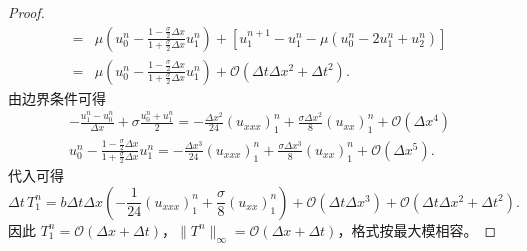 \begin{proof}
\begin{align*}
        ={}                    & \mu\left( u_{0}^n -  \frac{1-\frac{\sigma}2 \Delta x}{1 + \frac{\sigma}2 \Delta x} u_1^n \right)
        + \left[
        u_1^{n+1} - u_1^n - \mu(u_{0}^n - 2 u_1^n + u_2^n)
        \right]                                                                                                                            \\
        ={}                    & \mu\left( u_{0}^n -  \frac{1-\frac{\sigma}2 \Delta x}{1 + \frac{\sigma}2 \Delta x} u_1^n \right)
        + \mathcal{O}( \Delta t \Delta x^2 + \Delta t^2).
    \end{align*}
    由边界条件可得
    \begin{gather*}
        - \frac{u_1^n - u_{0}^n}{\Delta x} + \sigma \frac{u_0^n + u_1^n}2 = -\frac{\Delta x^2}{24} (u_{xxx})_1^n + \frac{\sigma \Delta x^2}8 (u_{xx})_1^n + \mathcal{O}(\Delta x^4) \\
        u_{0}^n -  \frac{1-\frac{\sigma}2 \Delta x}{1 + \frac{\sigma}2 \Delta x} u_1^n = -\frac{\Delta x^3}{24} (u_{xxx})_1^n + \frac{\sigma \Delta x^3}8 (u_{xx})_1^n + \mathcal{O}(\Delta x^5).
    \end{gather*}
    代入可得
    \[
        \Delta t\, T_1^{n} ={} b \Delta t \Delta x \left( -\frac1{24} (u_{xxx})_1^n + \frac{\sigma}8 (u_{xx})_1^n \right)
        + \mathcal{O}(\Delta t\Delta x^3) + \mathcal{O}( \Delta t \Delta x^2 + \Delta t^2).
    \]
    因此 $T_1^n = \mathcal{O}(\Delta x + \Delta t)$，$\|T^n\|_{\infty} = \mathcal{O}(\Delta x + \Delta t)$，格式按最大模相容。
\end{proof}


